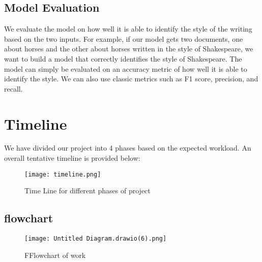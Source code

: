 \documentclass{article}
\begin{document}
\subsection{Model Evaluation}
We evaluate the model on how well it is able to identify the style of the writing based on the two inputs. For example, if our model gets two documents, one about horses and the other about horses written in the style of Shakespeare, we want to build a model that correctly identifies the style of Shakespeare. The model can simply be evaluated on an accuracy metric of how well it is able to identify the style. We can also use classic metrics such as F1 score, precision, and recall.

\section{Timeline}
We have divided our project into 4 phases based on the expected workload. An overall tentative timeline is provided below:\\
\begin{figure}[h]
  \centering
  \texttt{[image: timeline.png]}
  \caption{Time Line for different phases of project}
  \label{fig:example}
\end{figure}

\subsection{flowchart}
\begin{figure}[h]
  \centering
  \texttt{[image: Untitled Diagram.drawio(6).png]}
  \caption{FFlowchart of work}
  \label{fig:example}
\end{figure}
\clearpage
\end{document}
